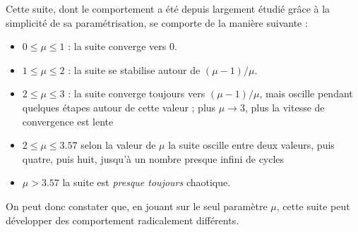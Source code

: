 \documentclass[12pt,a4paper]{article}
\begin{document}
Cette suite, dont le comportement a été depuis largement étudié grâce à la simplicité de sa paramétrisation, se comporte de la manière suivante : 
\begin{itemize}
\item $0 \leq \mu \leq 1$ : la suite converge vers 0.
\item $1 \leq \mu \leq 2$ : la suite se stabilise autour de $(\mu -1)/ \mu$.
\item $2 \leq \mu \leq 3$ : la suite converge toujours vers $(\mu -1)/ \mu$, mais oscille pendant quelques étapes autour de cette valeur ; plus $\mu \rightarrow 3$, plus la vitesse de convergence est lente
\item  $2 \leq \mu \leq 3.57$ selon la valeur de $\mu$ la suite oscille entre deux valeurs, puis quatre, puis huit, jusqu'à un nombre presque infini de cycles
\item $\mu > 3.57$ la suite est \textit{presque toujours} chaotique.
\end{itemize}
On peut donc constater que, en jouant sur le seul paramètre $\mu$, cette suite peut développer des comportement radicalement différents. 
\end{document}
